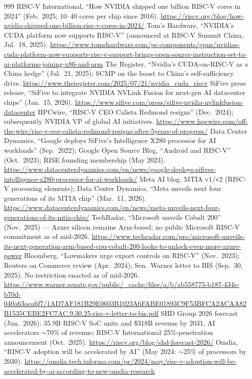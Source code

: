 \begin{thebibliography}{999}
 RISC-V International, ``How NVIDIA shipped one billion RISC-V cores in 2024'' (Feb.\ 2025; 10--40 cores per chip since 2016). \url{https://riscv.org/blog/how-nvidia-shipped-one-billion-risc-v-cores-in-2024/}
 Tom's Hardware, ``NVIDIA's CUDA platform now supports RISC-V'' (announced at RISC-V Summit China, Jul.\ 18, 2025). \url{https://www.tomshardware.com/pc-components/gpus/nvidias-cuda-platform-now-supports-risc-v-support-brings-open-source-instruction-set-to-ai-platforms-joining-x86-and-arm}
 The Register, ``Nvidia's CUDA-on-RISC-V as a China hedge'' (Jul.\ 21, 2025); SCMP on the boost to China's self-sufficiency drive. \url{https://www.theregister.com/2025/07/21/nvidia_cuda_riscv}
 SiFive press release, ``SiFive to integrate NVIDIA NVLink Fusion for next-gen AI datacenter chips'' (Jan.\ 15, 2026). \url{https://www.sifive.com/press/sifive-nvidia-nvlinkfusion-datacenter}
 HPCwire, ``RISC-V CEO Calista Redmond resigns'' (Dec.\ 2024); subsequently NVIDIA VP of global AI initiatives. \url{https://www.hpcwire.com/off-the-wire/risc-v-ceo-calista-redmond-resigns-after-5years-of-progress/}
 Data Center Dynamics, ``Google deploys SiFive's Intelligence X280 processor for AI workloads'' (Sep.\ 2022); Google Open Source Blog, ``Android and RISC-V'' (Oct.\ 2023); RISE founding membership (May 2023). \url{https://www.datacenterdynamics.com/en/news/google-deploys-sifives-intelligence-x280-processor-for-ai-workloads/}
 Meta AI blog, MTIA v1/v2 (RISC-V processing elements); Data Center Dynamics, ``Meta unveils next four generations of its MTIA chip'' (Mar.\ 11, 2026). \url{https://www.datacenterdynamics.com/en/news/meta-unveils-next-four-generations-of-its-mtia-chip/}
 TechRadar, ``Microsoft unveils Cobalt 200'' (Nov.\ 2025) --- Azure silicon remains Arm-based; no public Microsoft RISC-V commitment as of mid-2026. \url{https://www.techradar.com/pro/microsoft-unveils-its-next-generation-arm-based-cpu-cobalt-200-looks-to-unlock-even-more-azure-power}
 Bloomberg, ``Lawmakers urge export controls on RISC-V'' (Nov.\ 2023); Reuters on Commerce review (Apr.\ 2024); Sen.\ Warner letter to BIS (Sep.\ 30, 2025). No restriction enacted as of mid-2026. \url{https://www.warner.senate.gov/public/_cache/files/a/b/ab558775-b187-434e-b70d-040a63aea6f7/1AD7AF181B29E0603B1023A6FABE01893C9F53BFCA2ACAA82B1535CEBE2FC7AC.9.30.25-risc-v-letter-to-bis.pdf}
 SHD Group 2026 forecast (Jun.\ 2026): 35.9B RISC-V SoC units and \$318B revenue by 2031, AI accelerators $\sim$70\% of revenue; RISC-V International 25\%-penetration announcement (Oct.\ 2025). \url{https://riscv.org/blog/shd-forecast-2026/}
 Omdia, ``RISC-V adoption will be accelerated by AI'' (May 2024: $\sim$25\% of processors by 2030). \url{https://omdia.tech.informa.com/pr/2024/may/risc-v-adoption-will-be-accelerated-by-ai-according-to-new-omdia-research}


\end{thebibliography}
